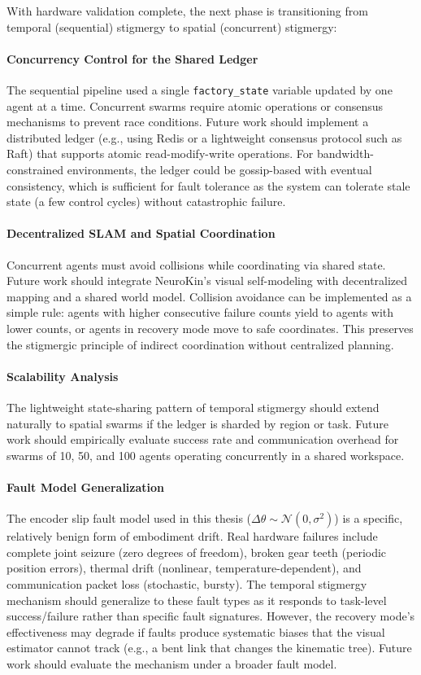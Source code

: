 ﻿\documentclass[12pt,a4paper,oneside]{report}
\begin{document}
With hardware validation complete, the next phase is transitioning from temporal (sequential) stigmergy to spatial (concurrent) stigmergy:

\paragraph{Concurrency Control for the Shared Ledger}
The sequential pipeline used a single \texttt{factory\_state} variable updated by one agent at a time. Concurrent swarms require atomic operations or consensus mechanisms to prevent race conditions. Future work should implement a distributed ledger (e.g., using Redis or a lightweight consensus protocol such as Raft) that supports atomic read-modify-write operations. For bandwidth-constrained environments, the ledger could be gossip-based with eventual consistency, which is sufficient for fault tolerance as the system can tolerate stale state (a few control cycles) without catastrophic failure.

\paragraph{Decentralized SLAM and Spatial Coordination}
Concurrent agents must avoid collisions while coordinating via shared state. Future work should integrate NeuroKin's visual self-modeling with decentralized mapping and a shared world model. Collision avoidance can be implemented as a simple rule: agents with higher consecutive failure counts yield to agents with lower counts, or agents in recovery mode move to safe coordinates. This preserves the stigmergic principle of indirect coordination without centralized planning.

\paragraph{Scalability Analysis}
The lightweight state-sharing pattern of temporal stigmergy should extend naturally to spatial swarms if the ledger is sharded by region or task. Future work should empirically evaluate success rate and communication overhead for swarms of 10, 50, and 100 agents operating concurrently in a shared workspace.

\paragraph{Fault Model Generalization}
The encoder slip fault model used in this thesis ($\Delta \theta \sim \mathcal{N}(0, \sigma^2)$) is a specific, relatively benign form of embodiment drift. Real hardware failures include complete joint seizure (zero degrees of freedom), broken gear teeth (periodic position errors), thermal drift (nonlinear, temperature-dependent), and communication packet loss (stochastic, bursty). The temporal stigmergy mechanism should generalize to these fault types as it responds to task-level success/failure rather than specific fault signatures. However, the recovery mode's effectiveness may degrade if faults produce systematic biases that the visual estimator cannot track (e.g., a bent link that changes the kinematic tree). Future work should evaluate the mechanism under a broader fault model.
\end{document}
